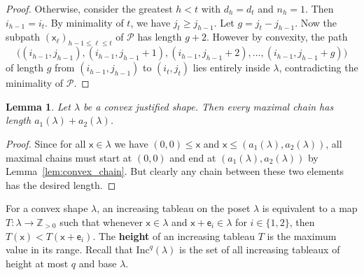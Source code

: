 \documentclass[12pt]{amsart}
\newcommand{\x}{\ensuremath{\mathsf{x}}}
\newcommand{\e}{\ensuremath{\mathsf{e}}}
\newtheorem{lemma}[theorem]{Lemma}
\theoremstyle{definition}
\theoremstyle{remark}
\numberwithin{equation}{section}
\newcommand{\inc}{\ensuremath{\mathrm{Inc}}}
\begin{document}
\begin{proof}
Otherwise, consider the greatest $h < t$ with $d_h = d_t$ and $n_h = 1$. Then $i_{h-1} = i_t$. By minimality of $t$, we have $j_t \geq j_{h-1}$. Let $g = j_t - j_{h-1}$. Now the subpath $(\x_{\ell})_{h-1\leq \ell \leq t}$ of $\mathscr{P}$ has length $g + 2$. However by convexity, the path 
\[
\big( (i_{h-1}, j_{h-1}),   (i_{h-1}, j_{h-1} + 1), (i_{h-1}, j_{h-1} + 2), \dots , (i_{h-1}, j_{h-1} + g) \big)
\]
of length $g$ from $(i_{h-1}, j_{h-1})$ to $(i_t, j_t)$ lies entirely inside $\lambda$, contradicting the minimality of $\mathscr{P}$.
\end{proof}

\begin{lemma}\label{lem:max_chain_same}
Let $\lambda$ be a convex justified shape. Then every maximal chain has length $a_1(\lambda) + a_2(\lambda)$. 
\end{lemma}
\begin{proof} 
Since for all $\x \in \lambda$ we have $(0,0) \leq \x$ and $\x \leq (a_1(\lambda),a_2(\lambda))$, all maximal chains must start at $(0,0)$ and end at $(a_1(\lambda),a_2(\lambda))$ by Lemma~\ref{lem:convex_chain}. But clearly any chain between these two elements has the desired length.
\end{proof} 

For a convex shape $\lambda$, an increasing tableau on the poset $\lambda$ is equivalent to a map $T: \lambda \rightarrow \mathbb{Z}_{>0}$ such that whenever $\x \in \lambda$ and $\x+\e_i \in \lambda$ for $i \in \lbrace 1,2 \rbrace$, then $T(\x) < T(\x+\e_i)$. The {\bf height} of an increasing tableau $T$ is the maximum value in its range. Recall that $\inc^q(\lambda)$ is the set of all increasing tableaux of height at most $q$ and base $\lambda$. 
\end{document}
